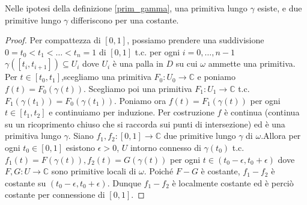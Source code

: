 \begin{prop}
  Nelle ipotesi della definizione \ref{prim_gamma}, una primitiva lungo $\gamma$ esiste, e due primitive lungo $\gamma$ differiscono per una costante.
\end{prop}

\begin{proof}
  Per compattezza di $[0, 1]$, possiamo prendere una suddivisione $0=t_0<t_1<\dots<t_n=1$ di $[0, 1]$ t.c. per ogni $i=0,\dots, n-1$ $\gamma([t_i, t_{i+1}]) \subseteq U_i$ dove $U_i$ è una palla in $D$ su cui $\omega$ ammette una primitiva.
  Per $t \in [t_0, t_1]$,scegliamo una primitiva $F_0:U_0 \longrightarrow \mathbb{C}$ e poniamo $f(t)=F_0(\gamma(t))$. Scegliamo poi una primitiva $F_1:U_1 \longrightarrow \mathbb{C}$ t.c. $F_1(\gamma(t_1))=F_0(\gamma(t_1))$. Poniamo ora $f(t)=F_1(\gamma(t))$ per ogni $t \in [t_1, t_2]$ e continuiamo per induzione. Per costruzione $f$ è continua (continua su un ricoprimento chiuso che si raccorda sui punti di intersezione) ed è una primitiva lungo $\gamma$.
  Siano $f_1, f_2:[0, 1] \longrightarrow \mathbb{C}$ due primitive lungo $\gamma$ di $\omega$.Allora per ogni $t_0 \in [0, 1]$ esistono $\epsilon>0$, $U$ intorno connesso di $\gamma(t_0)$ t.c. $f_1(t)=F(\gamma(t)), f_2(t)=G(\gamma(t))$ per ogni $ t \in (t_0-\epsilon, t_0+\epsilon)$ dove $F, G:U \longrightarrow \mathbb{C}$ sono primitive locali di $\omega$.
  Poiché $F-G$ è costante, $f_1-f_2$ è costante su $(t_0-\epsilon, t_0+\epsilon)$. Dunque $f_1-f_2$ è localmente costante ed è perciò costante per connessione di $[0, 1]$.
\end{proof}

